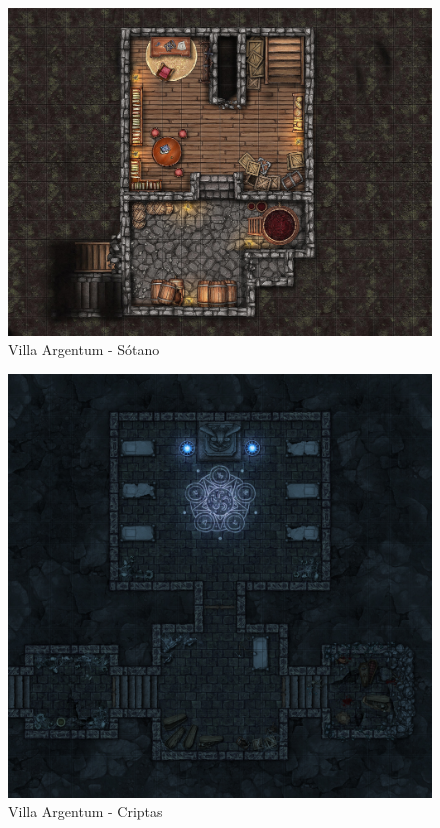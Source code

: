 \documentclass[10pt,twoside,twocolumn,openany]{dndbook}
\begin{document}
\begin{figure}[hb!]
  \centering
  \includegraphics[width=\textwidth]{maps/villa-argentum-s1.jpg}
  \caption{Villa Argentum - Sótano}
  \label{fig:vas1full}
\end{figure}

\begin{figure}[hb!]
  \centering
  \includegraphics[width=\textwidth]{maps/villa-argentum-s2.jpg}
  \caption{Villa Argentum - Criptas}
  \label{fig:vas2full}
\end{figure}
\end{document}
